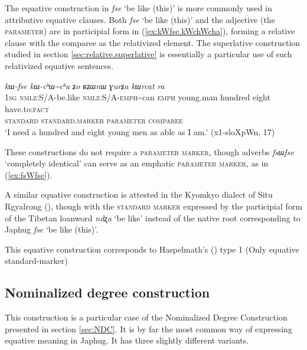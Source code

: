 \documentclass[oneside,a4paper,12pt]{article}
\newcommand{\ipa}[1]{{\phon\textit{#1}}}
\newcommand{\forme}[2]{\ipa{#1} `#2'}
\newcommand{\rdp}{\textasciitilde{}}
\begin{document}
The equative construction in \forme{fse}{be like (this)} is more commonly used in attributive equative clauses. Both \forme{fse}{be like (this)} and the adjective (the \textsc{parameter}) are in participial form in (\ref{ex:kWfse.kWchWcha}), forming a relative clause with the comparee as the relativized element. The superlative construction studied in section \ref{sec:relative.superlative} is essentially a particular use of such relativized equative sentences.

\begin{exe}
\ex \label{ex:kWfse.kWchWcha}
\glll \ipa{aʑo} 	\ipa{kɯ-fse} 	\ipa{kɯ-cʰɯ\rdp{}cʰa} 	\ipa{ʑo} 	\ipa{ʁʑɯnɯ} 	\ipa{ɣurʑa} 	\ipa{kɯrcat} 	\ipa{ra}  \\
\textsc{1sg} \textsc{nmlz}:S/A-be.like \textsc{nmlz}:S/A-\textsc{emph}\rdp{}can \textsc{emph} young.man hundred eight have.to:\textsc{fact} \\
\textsc{standard} \textsc{standard.marker} \textsc{parameter} { } \textsc{comparee} \\
\glt `I need a hundred and eight young men as able as I am.' (x1-sloXpWn, 17)
\end{exe}

These constructions do not require a \textsc{parameter marker}, though adverbs \forme{fsɯfse}{completely identical} can serve as an emphatic \textsc{parameter marker}, as in (\ref{ex:fsWfse}).

A similar equative construction is attested in the Kyomkyo dialect of Situ Rgyalrong (\citealt[238]{prins11kyomkyo}), though with the \textsc{standard marker} expressed by the participial form of the Tibetan loanword \forme{ndʐa}{be like} instead of the native root corresponding to Japhug \forme{fse}{be like (this)}.

This equative construction corresponds to Haspelmath's (\citeyear{haspelmath17equative}) type 1 (Only equative standard-marker)

\subsection{Nominalized degree construction} \label{sec:NDC.equative}
This construction is a particular case of the Nominalized Degree Construction presented in section \ref{sec:NDC}. It is by far the most common way of expressing equative meaning in Japhug. It has three slightly different variants. 
\end{document}
